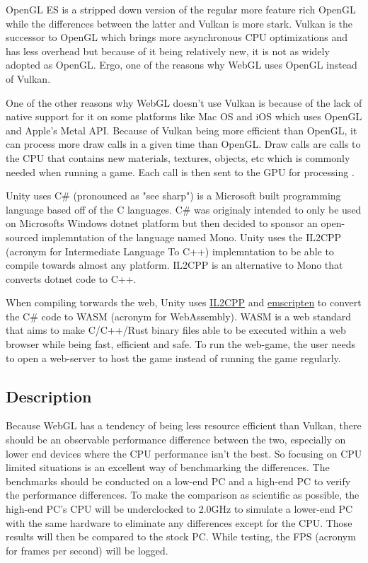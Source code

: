 \documentclass{article}
\begin{document}
OpenGL ES is a stripped down version of the regular more feature rich OpenGL while the differences between the latter and Vulkan is more stark. Vulkan is the successor to OpenGL which brings more asynchronous CPU optimizations and has less overhead but because of it being relatively new, it is not as widely adopted as OpenGL. Ergo, one of the reasons why WebGL uses OpenGL instead of Vulkan.

One of the other reasons why WebGL doesn’t use Vulkan is because of the lack of native support for it on some platforms like Mac OS and iOS which uses OpenGL and Apple’s Metal API. Because of Vulkan being more efficient than OpenGL, it can process more draw calls in a given time than OpenGL. Draw calls are calls to the CPU that contains new materials, textures, objects, etc which is commonly needed when running a game. Each call is then sent to the GPU for processing \cite{DrawCalls}.

Unity uses C\# (pronounced as "see sharp") is a Microsoft built programming language based off of the C languages. C\# was originaly intended to only be used on Microsofts Windows dotnet platform but then decided to sponsor an open-sourced implemntation of the language named Mono\cite{CSharpWiki}. Unity uses the IL2CPP (acronym for Intermediate Language To C++) implemntation to be able to compile towards almost any platform. IL2CPP is an alternative to Mono that converts dotnet code to C++\cite{IL2CPP}.

When compiling torwards the web, Unity uses \href{https://docs.unity3d.com/Manual/IL2CPP.html}{IL2CPP} and \href{https://emscripten.org/}{emscripten} to convert the C\# code to WASM (acronym for WebAssembly)\cite{WebGL}. WASM is a web standard that aims to make C/C++/Rust binary files able to be executed within a web browser while being fast, efficient and safe\cite{WebAssembly}. To run the web-game, the user needs to open a web-server to host the game instead of running the game regularly.

\subsection {Description}
Because WebGL has a tendency of being less resource efficient than Vulkan, there should be an observable performance difference between the two, especially on lower end devices where the CPU performance isn’t the best. So focusing on CPU limited situations is an excellent way of benchmarking the differences. The benchmarks should be conducted on a low-end PC and a high-end PC to verify the performance differences.
To make the comparison as scientific as possible, the high-end PC’s CPU will be underclocked to 2.0GHz to simulate a lower-end PC with the same hardware to eliminate any differences except for the CPU. Those results will then be compared to the stock PC. While testing, the FPS (acronym for frames per second) will be logged.
\end{document}
